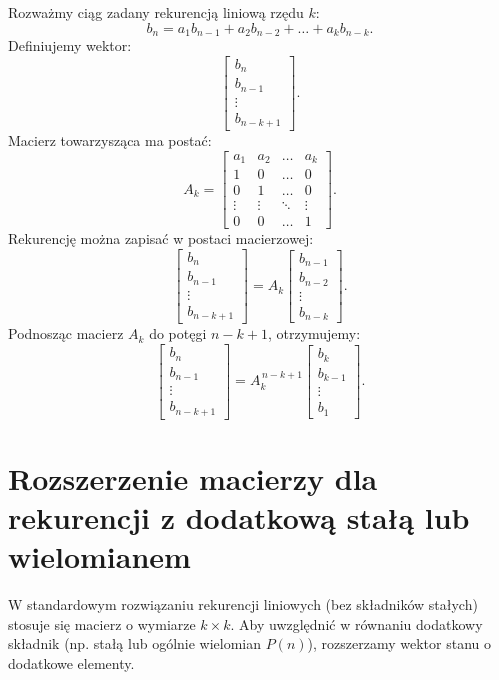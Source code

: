 \documentclass[12pt]{article}
\begin{document}
Rozważmy ciąg zadany rekurencją liniową rzędu \(k\):
\[
b_{n} = a_1 b_{n-1} + a_2 b_{n-2} + \dots + a_k b_{n-k}.
\]
Definiujemy wektor:
\[
\begin{bmatrix} 
b_{n} \\ 
b_{n-1} \\ 
\vdots \\ 
b_{n-k+1}
\end{bmatrix}.
\]
Macierz towarzysząca ma postać:
\[
A_k =
\begin{bmatrix} 
a_1 & a_2 & \dots & a_k \\ 
1   & 0   & \dots & 0   \\ 
0   & 1   & \dots & 0   \\ 
\vdots & \vdots & \ddots & \vdots \\ 
0   & 0   & \dots & 1 
\end{bmatrix}.
\]
Rekurencję można zapisać w postaci macierzowej:
\[
\begin{bmatrix} 
b_{n} \\ 
b_{n-1} \\ 
\vdots \\ 
b_{n-k+1}
\end{bmatrix} = A_k \begin{bmatrix} 
b_{n-1} \\ 
b_{n-2} \\ 
\vdots \\ 
b_{n-k}
\end{bmatrix}.
\]
Podnosząc macierz \(A_k\) do potęgi \(n-k+1\), otrzymujemy:
\[
\begin{bmatrix} 
b_{n} \\ 
b_{n-1} \\ 
\vdots \\ 
b_{n-k+1}
\end{bmatrix} = A_k^{\, n-k+1} \begin{bmatrix} 
b_{k} \\ 
b_{k-1} \\ 
\vdots \\ 
b_{1}
\end{bmatrix}.
\]
\section*{Rozszerzenie macierzy dla rekurencji z dodatkową stałą lub wielomianem}

W standardowym rozwiązaniu rekurencji liniowych (bez składników stałych) stosuje się macierz o wymiarze \( k \times k \). Aby uwzględnić w równaniu dodatkowy składnik (np. stałą lub ogólnie wielomian \( P(n) \)), rozszerzamy wektor stanu o dodatkowe elementy. 
\end{document}
